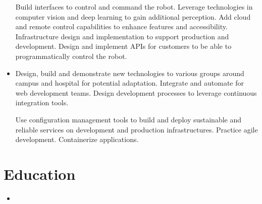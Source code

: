 \documentclass[11pt,a4paper,sans]{moderncv}        %
\begin{document}
\begin{itemize}
{{\vspace{3pt}
Build interfaces to control and command the robot. Leverage technologies in computer vision and deep learning to gain additional perception. Add cloud and remote control capabilities to enhance features and accessibility. Infrastructure design and implementation to support production and development. Design and implement APIs for customers to be able to programmatically control the robot.}
}

\vspace{3pt}


\item{
{\vspace{3pt}
Design, build and demonstrate new technologies to various groups around campus and hospital for potential adaptation. Integrate and automate for web development teams. Design development processes to leverage continuous integration tools. 
}
{\vspace{3pt}

Use configuration management tools to build and deploy sustainable and reliable services on development and production infrastructures. Practice agile development. Containerize applications.
}
}

\end{itemize}

\section{Education}

\vspace{6pt}

\begin{itemize}

\item{}

\end{itemize}
\end{document}
